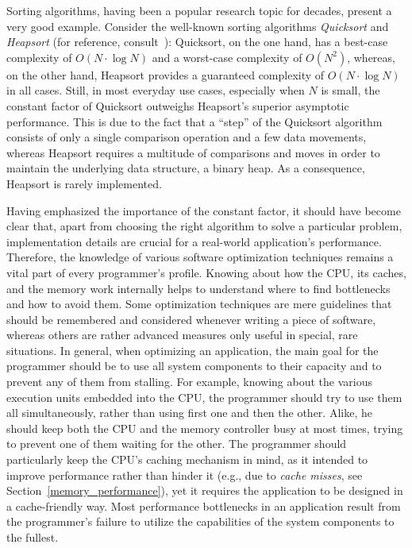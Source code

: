 Sorting algorithms, having been a popular research topic for decades, present a very good example. Consider the well-known sorting algorithms \emph{Quicksort} and \emph{Heapsort} (for reference, consult~\cite[pp. 113--122, 144--148]{knuth1998art}): Quicksort, on the one hand, has a best-case complexity of $O(N\cdot \log{N})$ and a worst-case complexity of $O(N^{2})$, whereas, on the other hand, Heapsort provides a guaranteed complexity of $O(N\cdot \log{N})$ in all cases. Still, in most everyday use cases, especially when $N$ is small, the constant factor of Quicksort outweighs Heapsort's superior asymptotic performance. This is due to the fact that a ``step'' of the Quicksort algorithm consists of only a single comparison operation and a few data movements, whereas Heapsort requires a multitude of comparisons and moves in order to maintain the underlying data structure, a binary heap. As a consequence, Heapsort is rarely implemented.

Having emphasized the importance of the constant factor, it should have become clear that, apart from choosing the right algorithm to solve a particular problem, implementation details are crucial for a real-world application's performance. Therefore, the knowledge of various software optimization techniques remains a vital part of every programmer's profile. Knowing about how the CPU, its caches, and the memory work internally helps to understand where to find bottlenecks and how to avoid them. Some optimization techniques are mere guidelines that should be remembered and considered whenever writing a piece of software, whereas others are rather advanced measures only useful in special, rare situations. In general, when optimizing an application, the main goal for the programmer should be to use all system components to their capacity and to prevent any of them from stalling. For example, knowing about the various execution units embedded into the CPU, the programmer should try to use them all simultaneously, rather than using first one and then the other. Alike, he should keep both the CPU and the memory controller busy at most times, trying to prevent one of them waiting for the other. The programmer should particularly keep the CPU's caching mechanism in mind, as it intended to improve performance rather than hinder it (e.g., due to \emph{cache misses}, see Section~\ref{memory_performance}), yet it requires the application to be designed in a cache-friendly way. Most performance bottlenecks in an application result from the programmer's failure to utilize the capabilities of the system components to the fullest.

